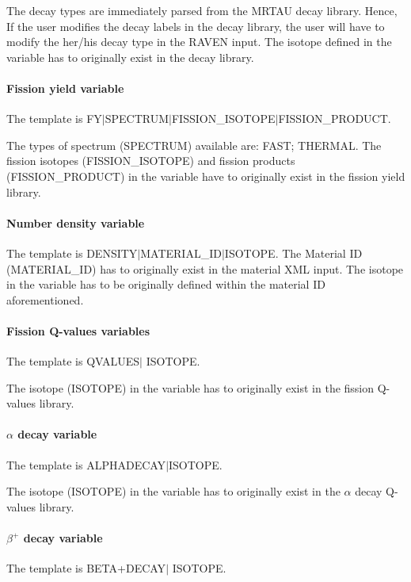 The decay types are immediately parsed from the MRTAU decay library. Hence, If the user modifies the decay labels
 in the decay library,
the user will have to modify the her/his decay type in the RAVEN input. The isotope defined in the variable has
 to originally exist in the decay library.

\paragraph{Fission yield variable} \label{FYPara}
The  template is FY$\vert$SPECTRUM$\vert$FISSION\_ISOTOPE$\vert$FISSION\_PRODUCT.

The types of spectrum (SPECTRUM) available are: FAST; THERMAL.
The fission isotopes (FISSION\_ISOTOPE) and fission products (FISSION\_PRODUCT) in the variable have to
originally exist in the fission yield library.

\paragraph{Number density variable} \label{NDPara}
The  template is DENSITY$\vert$MATERIAL\_ID$\vert$ISOTOPE.
The Material ID (MATERIAL\_ID) has to originally exist in the material XML input. The isotope in the variable has to
be originally defined within the material ID aforementioned.

\paragraph{Fission Q-values variables} \label{FQPara}
The  template is QVALUES$\vert$ ISOTOPE.

The isotope (ISOTOPE) in the variable has to originally exist in the fission Q-values library.

\paragraph{$\alpha$ decay variable} \label{AlphaPara}
The  template is ALPHADECAY$\vert$ISOTOPE.

The isotope (ISOTOPE) in the variable has to originally exist in the $\alpha$ decay Q-values library.

\paragraph{$\beta^{+}$ decay variable} \label{BetaPlusPara}
The  template is BETA+DECAY$\vert$ ISOTOPE.

